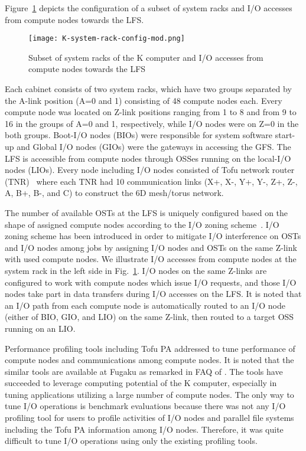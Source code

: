 \documentclass{jhps}
\begin{document}
Figure~\ref{fig:SUBSET_SYSRACK_K} depicts the configuration of a subset of system racks
and I/O accesses from compute nodes towards the LFS.
%
\begin{figure}[tb]
\centering
\texttt{[image: K-system-rack-config-mod.png]}
\caption{Subset of system racks of the K computer and I/O accesses from compute nodes
towards the LFS}
\label{fig:SUBSET_SYSRACK_K}
\end{figure}
%
Each cabinet consists of two system racks, which have two groups separated
by the A-link position (A=0 and 1) consisting of 48 compute nodes each.
Every compute node was located on Z-link positions ranging from 1 to 8 and
from 9 to 16 in the groups of A=0 and 1, respectively, while I/O nodes were
on Z=0 in the both groups.
Boot-I/O nodes (BIOs) were responsible for system software start-up and
Global I/O nodes (GIOs) were the gateways in accessing the GFS.
The LFS is accessible from compute nodes through OSSes running on the local-I/O nodes (LIOs).
Every node including I/O nodes consisted of Tofu network router (TNR)~\cite{tofu:micro2012}
where each TNR had 10 communication links (X+, X-, Y+, Y-, Z+, Z-, A, B+, B-, and C)
to construct the 6D mesh/torus network.

The number of available OSTs at the LFS is uniquely configured based on the shape of
assigned compute nodes according to the I/O zoning scheme~\cite{sumimoto:LUG2011}.
I/O zoning scheme has been introduced in order to mitigate I/O interference on OSTs
and I/O nodes among jobs by assigning I/O nodes and OSTs on the same Z-link
with used compute nodes.
We illustrate I/O accesses from compute nodes
at the system rack in the left side in Fig.~\ref{fig:SUBSET_SYSRACK_K}.
I/O nodes on the same Z-links are configured to work with compute nodes which
issue I/O requests, and those I/O nodes
take part in data transfers during I/O accesses on the LFS.
It is noted that an I/O path from each compute node is automatically routed to
an I/O node (either of BIO, GIO, and LIO) on the same Z-link,
then routed to a target OSS running on an LIO.

Performance profiling tools including Tofu PA addressed to tune performance of compute nodes
and communications among compute nodes.
It is noted that the similar tools are available at Fugaku
as remarked in FAQ of \cite{fugaku_info:web}.
The tools have succeeded to leverage computing potential of the K computer,
especially in tuning applications utilizing a large number of compute nodes.
The only way to tune I/O operations is benchmark evaluations
because there was not any I/O profiling tool for users to profile activities
of I/O nodes and parallel file systems including the Tofu PA information among I/O nodes.
Therefore, it was quite difficult to tune I/O operations using only the existing profiling tools.
\end{document}
